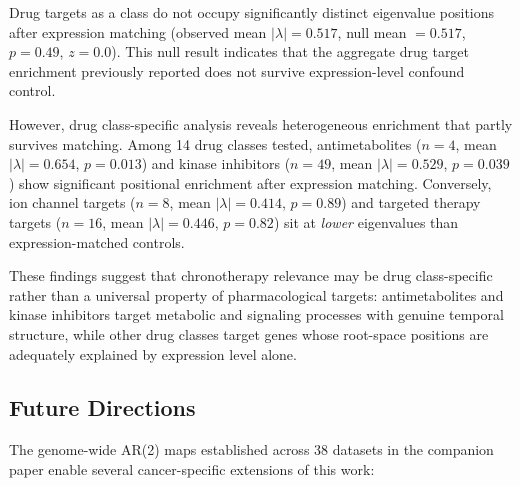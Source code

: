 \documentclass[11pt,letterpaper]{article}
\begin{document}
Drug targets as a class do not occupy significantly distinct eigenvalue positions after expression matching (observed mean $|\lambda| = 0.517$, null mean $= 0.517$, $p = 0.49$, $z = 0.0$). This null result indicates that the aggregate drug target enrichment previously reported does not survive expression-level confound control.

However, drug class-specific analysis reveals heterogeneous enrichment that partly survives matching. Among 14 drug classes tested, antimetabolites ($n = 4$, mean $|\lambda| = 0.654$, $p = 0.013$) and kinase inhibitors ($n = 49$, mean $|\lambda| = 0.529$, $p = 0.039$) show significant positional enrichment after expression matching. Conversely, ion channel targets ($n = 8$, mean $|\lambda| = 0.414$, $p = 0.89$) and targeted therapy targets ($n = 16$, mean $|\lambda| = 0.446$, $p = 0.82$) sit at \textit{lower} eigenvalues than expression-matched controls.

These findings suggest that chronotherapy relevance may be drug class-specific rather than a universal property of pharmacological targets: antimetabolites and kinase inhibitors target metabolic and signaling processes with genuine temporal structure, while other drug classes target genes whose root-space positions are adequately explained by expression level alone.

\subsection*{Future Directions}

The genome-wide AR(2) maps established across 38 datasets in the companion paper \citep{whiteside2026paper1} enable several cancer-specific extensions of this work:
\end{document}
